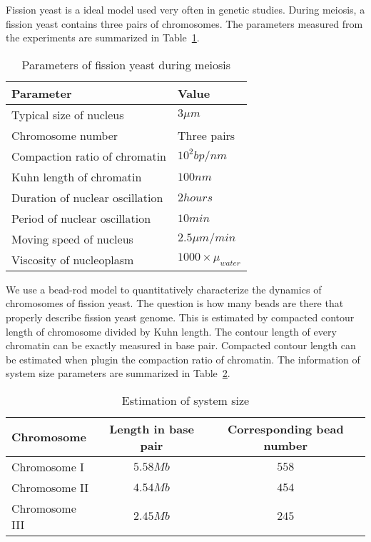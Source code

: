 \documentclass{article}
\begin{document}
Fission yeast is a ideal model used very often in genetic studies. During meiosis, a fission yeast contains three pairs of chromosomes. The parameters measured from the experiments are summarized in Table~\ref{tab:parameters}.
\begin{table}[!ht]
	\caption{Parameters of fission yeast during meiosis}
	\label{tab:parameters}
	\begin{tabular}{l|l}
		\hline
		\textbf{Parameter} & \textbf{Value} \\
		\hline
		Typical size of nucleus          &  $3\mu m$ \\
		Chromosome number                &  Three pairs \\
		Compaction ratio of chromatin    &  $10^2bp/nm$ \\
		Kuhn length of chromatin         &  $100nm$  \\
		Duration of nuclear oscillation  &  $2 hours$  \\
		Period of nuclear oscillation    &  $10 min$  \\
		Moving speed of nucleus          &  $2.5\mu m/min$ \\
		Viscosity of nucleoplasm         &  $1000\times \mu_{water}$ \\
		\hline
	\end{tabular}

\end{table}

We use a bead-rod model to quantitatively characterize the dynamics of chromosomes of fission yeast. 
The question is how many beads are there that properly describe fission yeast genome. This is estimated by compacted contour length of chromosome divided by Kuhn length. 
The contour length of every chromatin can be exactly measured in base pair. Compacted contour length can be estimated when plugin the compaction ratio of chromatin.
The information of system size parameters are summarized in Table~\ref{tab:size}.
\begin{table}[!ht]
	\caption{Estimation of system size}
	\label{tab:size}
	\begin{tabular}{l|c|c}
		\hline
		\textbf{Chromosome} & \textbf{Length in base pair} & \textbf{Corresponding bead number} \\
		\hline
		Chromosome I   & $5.58Mb$  & $558$ \\
		Chromosome II  & $4.54Mb$  & $454$ \\
		Chromosome III & $2.45Mb$  & $245$ \\
		\hline
	\end{tabular}
\end{table}
\end{document}
